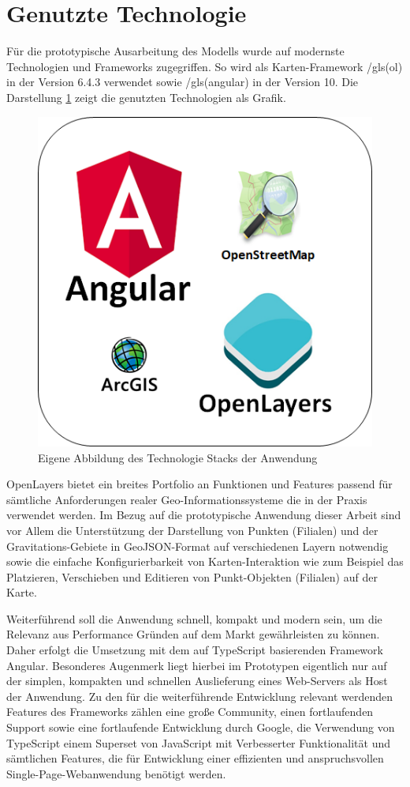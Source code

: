 \section{Genutzte Technologie}
Für die prototypische Ausarbeitung des Modells wurde auf modernste Technologien und Frameworks zugegriffen. So wird als Karten-Framework /gls(ol) in der Version 6.4.3 verwendet sowie /gls(angular) in der Version 10.
Die Darstellung \ref{img:tech_stack} zeigt die genutzten Technologien als Grafik.

\begin{figure}[H]
	\centering
	\includegraphics[]{resources/images/tech_stack.png}
	\caption{Eigene Abbildung des Technologie Stacks der Anwendung}
	\label{img:tech_stack}
\end{figure}

OpenLayers bietet ein breites Portfolio an Funktionen und Features passend für sämtliche Anforderungen realer Geo-Informationssysteme die in der Praxis verwendet werden. Im Bezug auf die prototypische Anwendung dieser Arbeit sind vor Allem die Unterstützung der Darstellung von Punkten (Filialen) und der Gravitations-Gebiete in GeoJSON-Format auf verschiedenen Layern notwendig sowie die einfache Konfigurierbarkeit von Karten-Interaktion wie zum Beispiel das Platzieren, Verschieben und Editieren von Punkt-Objekten (Filialen) auf der Karte.

Weiterführend soll die Anwendung schnell, kompakt und modern sein, um die Relevanz aus Performance Gründen auf dem Markt gewährleisten zu können. Daher erfolgt die Umsetzung mit dem auf TypeScript basierenden Framework Angular. Besonderes Augenmerk liegt hierbei im Prototypen eigentlich nur auf der simplen, kompakten und schnellen Auslieferung eines Web-Servers als Host der Anwendung. Zu den für die weiterführende Entwicklung relevant werdenden Features des Frameworks zählen eine große Community, einen fortlaufenden Support sowie eine fortlaufende Entwicklung durch Google, die Verwendung von TypeScript einem Superset von JavaScript mit Verbesserter Funktionalität und sämtlichen Features, die für Entwicklung einer effizienten und anspruchsvollen Single-Page-Webanwendung benötigt werden. 